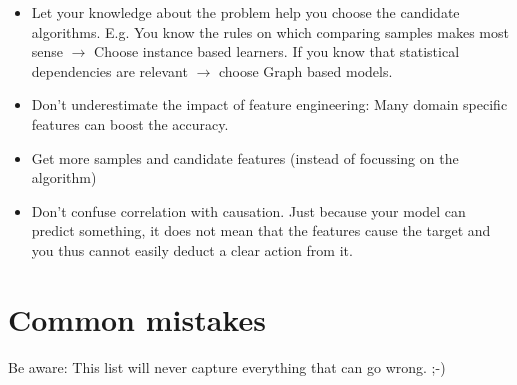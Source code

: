 \documentclass[
]{book}
\begin{document}
\begin{itemize}
\item
  Let your knowledge about the problem help you choose the candidate
  algorithms. E.g. You know the rules on which comparing samples makes
  most sense \(\rightarrow\) Choose instance based learners. If you know
  that statistical dependencies are relevant \(\rightarrow\) choose
  Graph based models.
\item
  Don't underestimate the impact of feature engineering: Many domain
  specific features can boost the accuracy.
\item
  Get more samples and candidate features (instead of focussing on the
  algorithm)
\item
  Don't confuse correlation with causation. Just because your model
  can predict something, it does not mean that the features cause the
  target and you thus cannot easily deduct a clear action from it.
\end{itemize}

\hypertarget{common-mistakes}{%
\section{Common mistakes}\label{common-mistakes}}

Be aware: This list will never capture everything that can go wrong. ;-)
\end{document}
